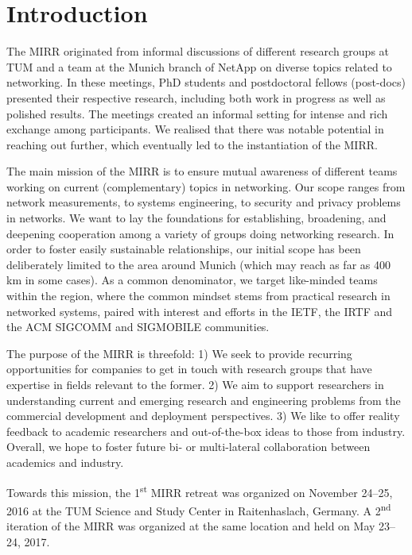 \section{Introduction}\label{sec:introduction}


The \ac{MIRR} originated from informal discussions of different research groups at \ac{TUM} and a team at the Munich branch of NetApp\cite{netapp} on diverse topics related to networking.
In these meetings, PhD students and postdoctoral fellows (post-docs) presented their respective research, including both work in progress as well as polished results.
The meetings created an informal setting for intense and rich exchange among participants.
We realised that there was notable potential in reaching out further, which eventually led to the instantiation of the \ac{MIRR}.

The main mission of the \ac{MIRR} is to ensure mutual awareness of different
teams working on current (complementary) topics in networking. Our scope ranges from network measurements, to systems engineering, to security and privacy problems in networks.
We want to lay
the foundations for establishing, broadening, and deepening cooperation among
a variety of groups doing networking research. In order to foster easily
sustainable relationships, our initial scope has been deliberately limited to
the area around Munich (which may reach as far as 400 km in some cases).  As a
common denominator, we target like-minded teams within the region, where the
common mindset stems from practical research in networked systems, paired with
interest and efforts in the \ac{IETF}, the \ac{IRTF} and the ACM SIGCOMM and
SIGMOBILE communities.

The purpose of the \ac{MIRR} is threefold: 1) We seek to provide recurring
opportunities for companies to get in touch with research groups that have
expertise in fields relevant to the former.  2) We aim to support researchers
in understanding current and emerging research and engineering problems from
the commercial development and deployment perspectives.  3) We like to offer
reality feedback to academic researchers and out-of-the-box ideas to those
from industry.  Overall, we hope to foster future bi- or multi-lateral
collaboration between academics and industry.

Towards this mission, the 1\textsuperscript{st} \ac{MIRR} retreat was organized
on November 24--25, 2016 at the \ac{TUM} Science and Study Center in
Raitenhaslach, Germany\cite{raitenhaslach}. A 2\textsuperscript{nd} iteration of the \ac{MIRR} was
organized at the same location and held on May 23--24, 2017.
